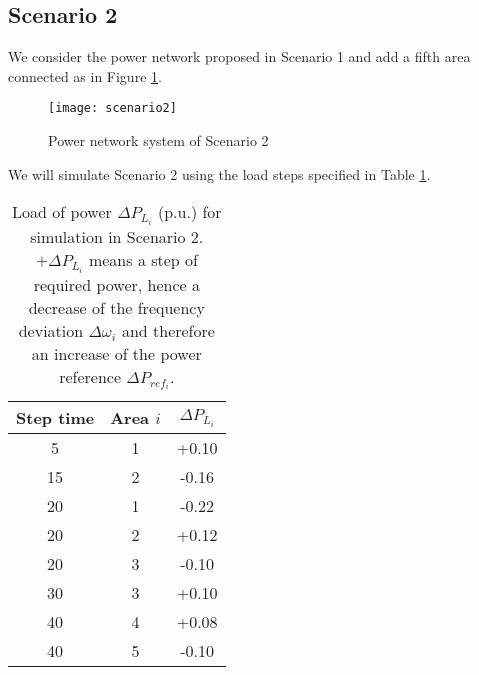 \documentclass[a4paper]{article}
\begin{document}
          \subsection{Scenario 2}
               \label{sec:scenario2}
               We consider the power network proposed in Scenario 1 and add a fifth area connected as in Figure \ref{fig:scenario2}.
               \begin{figure}[!ht]
                 \centering
                 \texttt{[image: scenario2]}
                 \caption{Power network system of Scenario 2}
                 \label{fig:scenario2}
               \end{figure}
               We will simulate Scenario 2 using the load steps specified in Table \ref{tab:simulationscen2}.
               \begin{table}[!ht]
                 \centering
                 \begin{tabular}{|c|c|c|}
                   \hline
                   Step time  &  Area $i$ & $\Delta P_{L_i}$ \\
                   \hline
                   5               &      1        &   +0.10             \\
                   \hline
                   15             &      2        &   -0.16             \\
                   \hline
                   20             &      1        &   -0.22             \\
                   \hline
                   20             &      2        &   +0.12             \\
                   \hline
                   20             &      3        &   -0.10             \\
                   \hline
                   30             &      3        &   +0.10             \\
                   \hline
                   40             &      4        &   +0.08             \\
                   \hline
                   40             &      5        &   -0.10             \\
                   \hline
                 \end{tabular}
                 \caption{Load of power $\Delta P_{L_i}$ (p.u.) for simulation in Scenario 2. $+\Delta P_{L_i}$ means a step of required power, hence a decrease of the frequency deviation $\Delta\omega_i$ and therefore an increase of the power reference $\Delta P_{ref_i}$.}
                 \label{tab:simulationscen2}
               \end{table}
\end{document}
